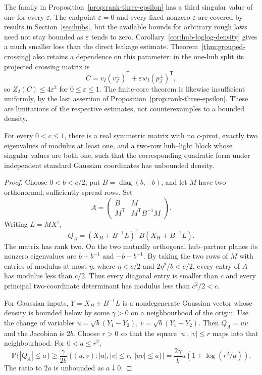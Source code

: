 The family in Proposition~\ref{prop:rank-three-epsilon}
has a third singular value of one for every \(\varepsilon\).
The endpoint \(\varepsilon=0\) and every fixed nonzero
\(\varepsilon\) are covered by results in
Section~\ref{sec:hubs}, but the available bounds for
arbitrary rough laws need not stay bounded as
\(\varepsilon\) tends to zero.
Corollary~\ref{cor:hub-loglog-density} gives a much smaller
loss than the direct leakage estimate.
Theorem~\ref{thm:grouped-crossing} also retains a dependence
on this parameter: in the one-hub split its projected
crossing matrix is
\[
 C=v_I(v_J^\perp)^{\mathsf T}
       +\varepsilon w_I(p_J^\perp)^{\mathsf T},
\]
so \(Z_2(C)\leq4\varepsilon^2\) for
\(0\leq\varepsilon\leq1\).
The finite-core theorem is likewise insufficient uniformly,
by the last assertion of Proposition~\ref{prop:rank-three-epsilon}.
These are limitations of the respective estimates, not
counterexamples to a bounded density.

\begin{proposition}
\label{prop:two-hub-counterexample}
For every \(0<c\leq1\), there is a real symmetric matrix
with no \(c\)-pivot, exactly two eigenvalues of modulus
at least one, and a two-row hub--light block whose
singular values are both one, such that the corresponding
quadratic form under independent standard Gaussian
coordinates has unbounded density.
\end{proposition}
\begin{proof}
Choose \(0<b<c/2\), put
\(B=\operatorname{diag}(b,-b)\), and let \(M\) have
two orthonormal, sufficiently spread rows.
Set
\[
 A=\begin{pmatrix}
 B&M\\ M^{\mathsf T}&M^{\mathsf T}B^{-1}M
 \end{pmatrix}.
\]
Writing \(L=MX'\),
\[
 Q_A=(X_H+B^{-1}L)^{\mathsf T}
       B(X_H+B^{-1}L).
\]
The matrix has rank two.  On the two mutually orthogonal
hub--partner planes its nonzero eigenvalues are
\(b+b^{-1}\) and \(-b-b^{-1}\).
By taking the two rows of \(M\) with entries of modulus
at most \(\eta\), where
\(\eta<c/2\) and \(2\eta^2/b<c/2\), every entry of
\(A\) has modulus less than \(c/2\).  Thus every
diagonal entry is smaller than \(c\) and every principal
two-coordinate determinant has modulus less than
\(c^2/2<c\).

For Gaussian inputs, \(Y=X_H+B^{-1}L\) is a nondegenerate
Gaussian vector whose density is bounded below by some
\(\gamma>0\) on a neighbourhood of the origin.
Use the change of variables
\(u=\sqrt b(Y_1-Y_2)\),
\(v=\sqrt b(Y_1+Y_2)\).
Then \(Q_A=uv\) and the Jacobian is \(2b\).
Choose \(r>0\) so that the square \(|u|,|v|\leq r\)
maps into that neighbourhood.  For \(0<a\leq r^2\),
\[
 \mathbb P\{|Q_A|\leq a\}
 \geq\frac{\gamma}{2b}
 \left|\{(u,v):|u|,|v|\leq r,\ |uv|\leq a\}\right|
 =\frac{2\gamma}{b}a(1+\log(r^2/a)).
\]
The ratio to \(2a\) is unbounded as \(a\downarrow0\).
\end{proof}

